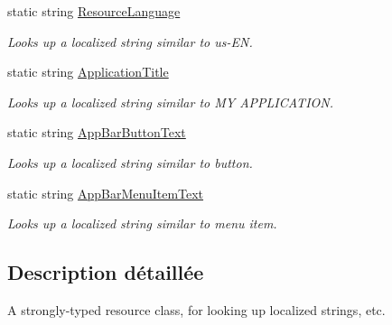 \begin{DoxyCompactItemize}
static string \hyperlink{class_pumgrana_1_1_resources_1_1_app_resources_ac94b56be19f1370de61d7fd0a3f89dc5}{Resource\+Language}
\begin{DoxyCompactList}\small\item\em Looks up a localized string similar to us-\/\+E\+N. \end{DoxyCompactList}\item 
static string \hyperlink{class_pumgrana_1_1_resources_1_1_app_resources_a3b76cfe92743e39375449ab47f0b6ad5}{Application\+Title}
\begin{DoxyCompactList}\small\item\em Looks up a localized string similar to M\+Y A\+P\+P\+L\+I\+C\+A\+T\+I\+O\+N. \end{DoxyCompactList}\item 
static string \hyperlink{class_pumgrana_1_1_resources_1_1_app_resources_a0e38cf2907db800682b19f49e042b8a0}{App\+Bar\+Button\+Text}
\begin{DoxyCompactList}\small\item\em Looks up a localized string similar to button. \end{DoxyCompactList}\item 
static string \hyperlink{class_pumgrana_1_1_resources_1_1_app_resources_a7455ca1d8388638f4ee95b15c7716d64}{App\+Bar\+Menu\+Item\+Text}
\begin{DoxyCompactList}\small\item\em Looks up a localized string similar to menu item. \end{DoxyCompactList}\end{DoxyCompactItemize}


\subsection{Description détaillée}
A strongly-\/typed resource class, for looking up localized strings, etc. 



